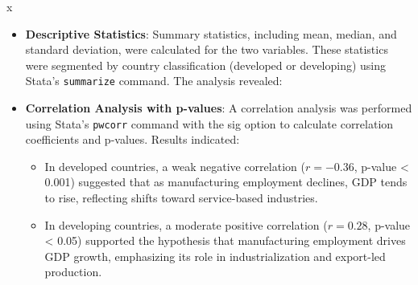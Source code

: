 x\documentclass[12pt]{article}
\begin{document}
\begin{itemize}
    \item \textbf{Descriptive Statistics}:  
    Summary statistics, including mean, median, and standard deviation, were calculated for the two variables. These statistics were segmented by country classification (developed or developing) using Stata's \texttt{summarize} command. The analysis revealed:

    \item \textbf{Correlation Analysis with p-values}:  
    A correlation analysis was performed using Stata’s \texttt{pwcorr} command with the {sig} option to calculate correlation coefficients and p-values. Results indicated:
    \begin{itemize}
        \item In developed countries, a weak negative correlation (\(r = -0.36\), p-value < 0.001) suggested that as manufacturing employment declines, GDP tends to rise, reflecting shifts toward service-based industries.
        \item In developing countries, a moderate positive correlation (\(r = 0.28\), p-value < 0.05) supported the hypothesis that manufacturing employment drives GDP growth, emphasizing its role in industrialization and export-led production.
    \end{itemize}


\end{itemize}
\end{document}

